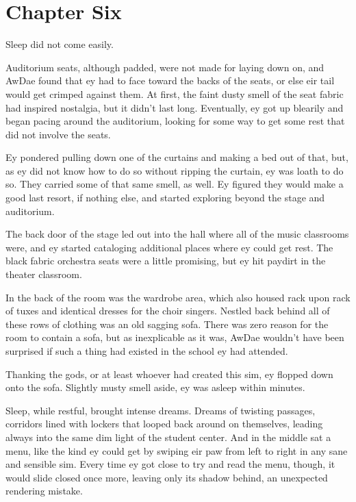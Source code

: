 \chapter*{Chapter Six}

Sleep did not come easily.

Auditorium seats, although padded, were not made for laying down on, and AwDae found that ey had to face toward the backs of the seats, or else eir tail would get crimped against them. At first, the faint dusty smell of the seat fabric had inspired nostalgia, but it didn't last long. Eventually, ey got up blearily and began pacing around the auditorium, looking for some way to get some rest that did not involve the seats.

Ey pondered pulling down one of the curtains and making a bed out of that, but, as ey did not know how to do so without ripping the curtain, ey was loath to do so. They carried some of that same smell, as well. Ey figured they would make a good last resort, if nothing else, and started exploring beyond the stage and auditorium.

The back door of the stage led out into the hall where all of the music classrooms were, and ey started cataloging additional places where ey could get rest. The black fabric orchestra seats were a little promising, but ey hit paydirt in the theater classroom.

In the back of the room was the wardrobe area, which also housed rack upon rack of tuxes and identical dresses for the choir singers. Nestled back behind all of these rows of clothing was an old sagging sofa. There was zero reason for the room to contain a sofa, but as inexplicable as it was, AwDae wouldn't have been surprised if such a thing had existed in the school ey had attended.

Thanking the gods, or at least whoever had created this sim, ey flopped down onto the sofa. Slightly musty smell aside, ey was asleep within minutes.

Sleep, while restful, brought intense dreams. Dreams of twisting passages, corridors lined with lockers that looped back around on themselves, leading always into the same dim light of the student center. And in the middle sat a menu, like the kind ey could get by swiping eir paw from left to right in any sane and sensible sim. Every time ey got close to try and read the menu, though, it would slide closed once more, leaving only its shadow behind, an unexpected rendering mistake.


